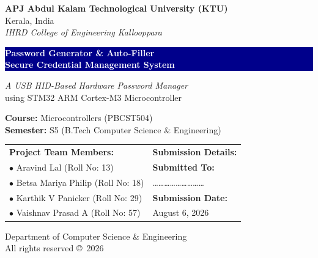 \documentclass[12pt,a4paper]{article}
\begin{document}

\thispagestyle{empty}

\begin{center}
\vspace*{0.2cm}

{\Large \textbf{APJ Abdul Kalam Technological University (KTU)}} \\[0.2cm]
{\normalsize Kerala, India} \\[0.1cm]
{\normalsize \textit{IHRD College of Engineering Kallooppara}} \\

\vfill

\colorbox{darkblue}{%
  \parbox{0.92\textwidth}{%
    \centering
    \vspace{0.6cm}
    {\LARGE \textbf{\textcolor{white}{Password Generator \& Auto-Filler}}} \\[0.2cm]
    {\Large \textbf{\textcolor{white}{Secure Credential Management System}}} \\
    \vspace{0.6cm}
  }%
}

\vfill

{\large \textit{A USB HID-Based Hardware Password Manager}} \\[0.15cm]
{\normalsize using STM32 ARM Cortex-M3 Microcontroller} \\

\vfill

{\normalsize \textbf{Course:} Microcontrollers (PBCST504)} \\[0.1cm]
{\normalsize \textbf{Semester:} S5 (B.Tech Computer Science \& Engineering)} \\

\vfill

\begin{table}[h!]
\centering
\begin{tabular}{p{} p{}}
\textbf{\large Project Team Members:} & \textbf{\large Submission Details:} \\[0.2cm]
$\bullet$ Aravind Lal (Roll No: 13) & \textbf{Submitted To:} \\[0.1cm]
$\bullet$ Betsa Mariya Philip (Roll No: 18) & \dots\dots\dots\dots\dots\dots\dots\dots\dots \\[0.2cm]
$\bullet$ Karthik V Panicker (Roll No: 29) & \textbf{Submission Date:} \\[0.1cm]
$\bullet$ Vaishnav Prasad A (Roll No: 57) & August 6, 2026 \\
\end{tabular}
\end{table}

\vfill

{\footnotesize Department of Computer Science \& Engineering} \\
{\footnotesize All rights reserved \copyright~2026}

\end{center}
\end{document}
